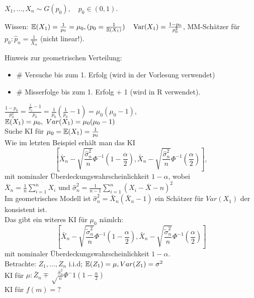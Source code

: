\documentclass{tstextbook}
\begin{document}
\begin{example}
	$ X_1, \ldots, X_n \sim G(p_0), \quad p_0 \in (0,1) $. 
	
	Wissen: $ \mathbb E(X_1) = \frac{1}{p_0} = \mu_0, (p_0= \frac{1}{\mathbb E(X_1)})\quad \operatorname{Var}(X_1) = \frac{1-p_0}{p_0^2} $, MM-Schätzer für $ p_0: \hat{p}_n = \frac{1}{\bar{X}_n} $ (nicht linear!).
	
	Hinweis zur geometrischen Verteilung: 
	\begin{itemize}
	\item $ \# $ Versuche bis zum 1. Erfolg (wird in der Vorlesung verwendet)
	\item $ \# $ Misserfolge bis zum 1. Erfolg + 1 (wird in R verwendet).
	\end{itemize}
	
	$ \frac{1-p_0}{p_0^2} = \frac{ \frac{1}{p_0} -1}{p_0} =  \frac{1}{p_0} (\frac{1}{p_0} -1) = \mu_0(\mu_0-1)$,\\
	$ \mathbb E(X_1)= \mu_0, \ Var(X_1) =  \mu_0(\mu_0-1)$\\
	
	Suche KI für $ \mu_0=\mathbb E(X_1)=\frac{1}{p_0} $\\
	Wie im letzten Beispiel erhält man das KI \\
	\[
	\left[ 
	\bar{X}_n - \sqrt{\frac{\hat{\sigma}_n^2}{n}} \Phi^{-1} \left(1-\frac{\alpha}{2}\right), \bar{X}_n - \sqrt{\frac{\hat{\sigma}_n^2}{n}} \Phi^{-1} \left(\frac{\alpha}{2}\right)\right], 
	\]
	mit nominaler Überdeckungswahrscheinlichkeit $ 1-\alpha $, wobei \\
	
	$ \bar{X}_n = \frac{1}{n} \sum_{i=1}^{n} X_i \text{ und } \hat{\sigma}_n^2 = \frac{1}{n-1} \sum_{i=1}^{n} (X_i - \bar{X}-n)^2 $ \\
	
	Im geometrisches Modell ist $ \hat{\sigma}_n^2 = \bar{X}_n (\bar{X}_n - 1) $ ein Schätzer für $Var(X_1)$ der konsistent ist.\\
	
	Das gibt ein witeres KI für $\mu_0$ nämlch: \\
	\[
	\left[ 
	\bar{X}_n - \sqrt{\frac{\tilde{\sigma}_n^2}{n}} \Phi^{-1} \left(1-\frac{\alpha}{2}\right), \bar{X}_n - \sqrt{\frac{\tilde{\sigma}_n^2}{n}} \Phi^{-1} \left(\frac{\alpha}{2}\right)\right]
	\]
	mit nominaler Überdeckungswahrscheinlichkeit $ 1-\alpha $.\\
	
	Betrachte: $Z_1,...,Z_n$ i.i.d; $\mathbb E(Z_1)=\mu, Var(Z_1)=\sigma^2$ \\
	KI für $\mu:  \bar{Z}_n \mp \sqrt\frac{{\hat{\sigma}_n^2}}{n} \Phi^-1 (1-\frac{\alpha}{2}) $ \\
	KI für $ f(m) =?$\\
	

\end{example}
\end{document}
